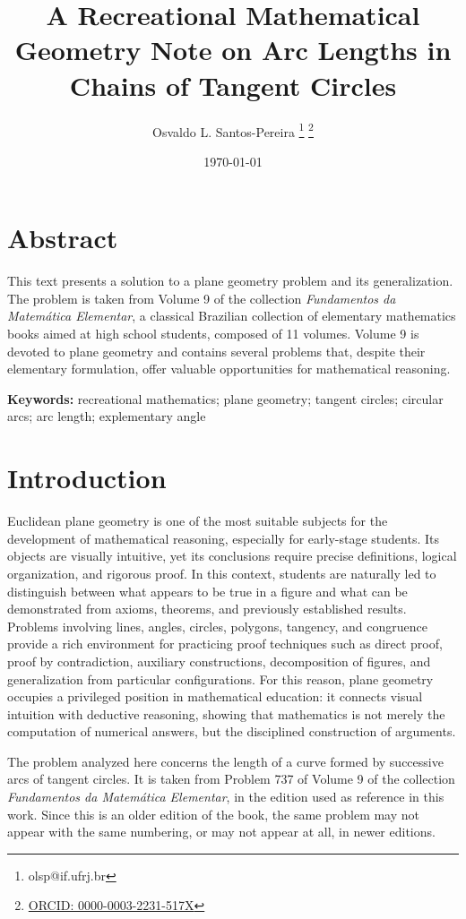 \documentclass[a4paper,12pt,oneside]{article}
\title{A Recreational Mathematical Geometry Note on Arc Lengths in Chains of Tangent Circles}
\author[1]{Osvaldo L. Santos-Pereira 
\thanks{olsp@if.ufrj.br}
\thanks{\href{https://orcid.org/0000-0003-2231-517X}{ORCID: 0000-0003-2231-517X}}}
\affil[1]{Graduate Program in Multidisciplinary Applied Physics (PPGMFA) Physics Institute Universidade Federal do Rio de Janeiro (UFRJ)}
\date{\today}
\makeatletter
\renewenvironment{abstract}{
    \if@twocolumn
        \section*{Abstract}
    \else
        \small
        \begin{center}
            {\bfseries \abstractname\vspace{-.5em}\vspace{\z@}}%
        \end{center}
        \noindent
    \fi
}
\numberwithin{equation}{section}
\def\ni{\noindent}
\numberwithin{equation}{section}
\makeatother
\begin{document}
\maketitle

\begin{abstract}
\ni
This text presents a solution to a plane geometry problem and its generalization. The problem is taken from Volume 9 of the collection \textit{Fundamentos da Matemática Elementar}, a classical Brazilian collection of elementary mathematics books aimed at high school students, composed of 11 volumes. Volume 9 is devoted to plane geometry and contains several problems that, despite their elementary formulation, offer valuable opportunities for mathematical reasoning.
\end{abstract}

\noindent\textbf{Keywords:} recreational mathematics; plane geometry; tangent circles; circular arcs; arc length; explementary angle

\section{Introduction}

Euclidean plane geometry is one of the most suitable subjects for the development of mathematical reasoning, especially for early-stage students. Its objects are visually intuitive, yet its conclusions require precise definitions, logical organization, and rigorous proof. In this context, students are naturally led to distinguish between what appears to be true in a figure and what can be demonstrated from axioms, theorems, and previously established results. Problems involving lines, angles, circles, polygons, tangency, and congruence provide a rich environment for practicing proof techniques such as direct proof, proof by contradiction, auxiliary constructions, decomposition of figures, and generalization from particular configurations. For this reason, plane geometry occupies a privileged position in mathematical education: it connects visual intuition with deductive reasoning, showing that mathematics is not merely the computation of numerical answers, but the disciplined construction of arguments.

\ni
The problem analyzed here concerns the length of a curve formed by successive arcs of tangent circles. It is taken from Problem 737 of Volume 9 of the collection \textit{Fundamentos da Matemática Elementar}, in the edition used as reference in this work. Since this is an older edition of the book, the same problem may not appear with the same numbering, or may not appear at all, in newer editions.
\end{document}
